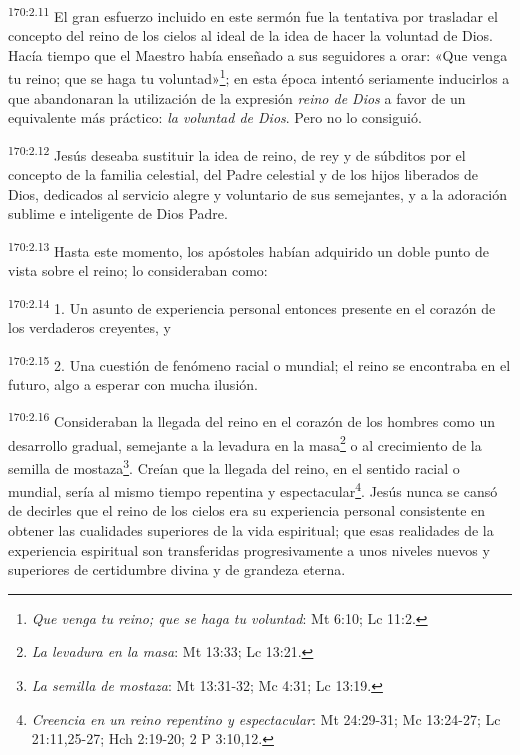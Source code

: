 \par 
\textsuperscript{170:2.11} El gran esfuerzo incluido en este sermón fue la tentativa por trasladar el concepto del reino de los cielos al ideal de la idea de hacer la voluntad de Dios. Hacía tiempo que el Maestro había enseñado a sus seguidores a orar: «Que venga tu reino; que se haga tu voluntad»\footnote{\textit{Que venga tu reino; que se haga tu voluntad}: Mt 6:10; Lc 11:2.}; en esta época intentó seriamente inducirlos a que abandonaran la utilización de la expresión \textit{reino de Dios} a favor de un equivalente más práctico: \textit{la voluntad de Dios}. Pero no lo consiguió.

\par 
\textsuperscript{170:2.12} Jesús deseaba sustituir la idea de reino, de rey y de súbditos por el concepto de la familia celestial, del Padre celestial y de los hijos liberados de Dios, dedicados al servicio alegre y voluntario de sus semejantes, y a la adoración sublime e inteligente de Dios Padre.

\par 
\textsuperscript{170:2.13} Hasta este momento, los apóstoles habían adquirido un doble punto de vista sobre el reino; lo consideraban como:

\par 
\textsuperscript{170:2.14} 1. Un asunto de experiencia personal entonces presente en el corazón de los verdaderos creyentes, y

\par 
\textsuperscript{170:2.15} 2. Una cuestión de fenómeno racial o mundial; el reino se encontraba en el futuro, algo a esperar con mucha ilusión.

\par 
\textsuperscript{170:2.16} Consideraban la llegada del reino en el corazón de los hombres como un desarrollo gradual, semejante a la levadura en la masa\footnote{\textit{La levadura en la masa}: Mt 13:33; Lc 13:21.} o al crecimiento de la semilla de mostaza\footnote{\textit{La semilla de mostaza}: Mt 13:31-32; Mc 4:31; Lc 13:19.}. Creían que la llegada del reino, en el sentido racial o mundial, sería al mismo tiempo repentina y espectacular\footnote{\textit{Creencia en un reino repentino y espectacular}: Mt 24:29-31; Mc 13:24-27; Lc 21:11,25-27; Hch 2:19-20; 2 P 3:10,12.}. Jesús nunca se cansó de decirles que el reino de los cielos era su experiencia personal consistente en obtener las cualidades superiores de la vida espiritual; que esas realidades de la experiencia espiritual son transferidas progresivamente a unos niveles nuevos y superiores de certidumbre divina y de grandeza eterna.

